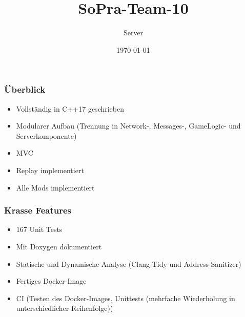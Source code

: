 \documentclass[aspectratio=169]{beamer}
\title{SoPra-Team-10}
\author{Server}
\date{\today}
\begin{document}
\maketitle

\begin{frame}
    \frametitle{Überblick}
    \begin{itemize}
        \item Vollständig in C++17 geschrieben
            \pause
        \item Modularer Aufbau (Trennung in Network-, Messages-, GameLogic- und Serverkomponente)
            \pause
        \item MVC
            \pause
        \item Replay implementiert
            \pause
        \item Alle Mods implementiert
    \end{itemize}
\end{frame}

\begin{frame}
    \frametitle{Krasse Features}
    \begin{itemize}
        \item 167 Unit Tests %
            \pause
        \item Mit Doxygen dokumentiert
            \pause
        \item Statische und Dynamische Analyse (Clang-Tidy und Address-Sanitizer)
            \pause
        \item Fertiges Docker-Image
            \pause
        \item CI (Testen des Docker-Images, Unittests (mehrfache Wiederholung in unterschiedlicher Reihenfolge))
    \end{itemize}
\end{frame}
\end{document}
